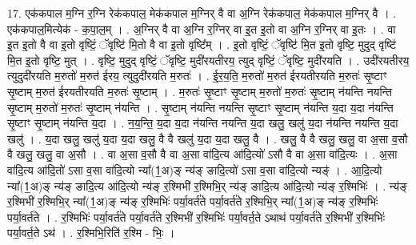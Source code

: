 \documentclass[17pt]{extarticle}
\begin{document}
17. एक॑कपाल म॒ग्नि र॒ग्नि रेक॑कपाल॒ मेक॑कपाल म॒ग्निर् वै वा अ॒ग्नि रेक॑कपाल॒ मेक॑कपाल म॒ग्निर् वै । . एक॑कपाल॒मित्येक॑ - क॒पा॒ल॒म् । . अ॒ग्निर् वै वा अ॒ग्नि र॒ग्निर् वा इ॒त इ॒तो वा अ॒ग्नि र॒ग्निर् वा इ॒तः । . वा इ॒त इ॒तो वै वा इ॒तो वृष्टिं॒ ॅवृष्टि॑ मि॒तो वै वा इ॒तो वृष्टि᳚म् । . इ॒तो वृष्टिं॒ ॅवृष्टि॑ मि॒त इ॒तो वृष्टि॒ मुदुद् वृष्टि॑ मि॒त इ॒तो वृष्टि॒ मुत् । . वृष्टि॒ मुदुद् वृष्टिं॒ ॅवृष्टि॒ मुदी॑रयतीरय॒ त्युद् वृष्टिं॒ ॅवृष्टि॒ मुदी॑रयति । . उदी॑रयतीरय॒ त्युदुदी॑रयति म॒रुतो॑ म॒रुत॑ ईरय॒ त्युदुदी॑रयति म॒रुतः॑ । . ई॒र॒य॒ति॒ म॒रुतो॑ म॒रुत॑ ईरयतीरयति म॒रुतः॑ सृ॒ष्टाꣳ सृ॒ष्टाम् म॒रुत॑ ईरयतीरयति म॒रुतः॑ सृ॒ष्टाम् । . म॒रुतः॑ सृ॒ष्टाꣳ सृ॒ष्टाम् म॒रुतो॑ म॒रुतः॑ सृ॒ष्टाम् न॑यन्ति नयन्ति सृ॒ष्टाम् म॒रुतो॑ म॒रुतः॑ सृ॒ष्टाम् न॑यन्ति । . सृ॒ष्टाम् न॑यन्ति नयन्ति सृ॒ष्टाꣳ सृ॒ष्टाम् न॑यन्ति य॒दा य॒दा न॑यन्ति सृ॒ष्टाꣳ सृ॒ष्टाम् न॑यन्ति य॒दा । . न॒य॒न्ति॒ य॒दा य॒दा न॑यन्ति नयन्ति य॒दा खलु॒ खलु॑ य॒दा न॑यन्ति नयन्ति य॒दा खलु॑ । . य॒दा खलु॒ खलु॑ य॒दा य॒दा खलु॒ वै वै खलु॑ य॒दा य॒दा खलु॒ वै । . खलु॒ वै वै खलु॒ खलु॒ वा अ॒सा व॒सौ वै खलु॒ खलु॒ वा अ॒सौ । . वा अ॒सा व॒सौ वै वा अ॒सा वा॑दि॒त्य आ॑दि॒त्यो॑ ऽसौ वै वा अ॒सा वा॑दि॒त्यः । . अ॒सा वा॑दि॒त्य आ॑दि॒तो॑ ऽसा व॒सा वा॑दि॒त्यो न्या᳚(1॒अ)ङ् न्य॑ङ् ङादि॒त्यो॑ ऽसा व॒सा वा॑दि॒त्यो न्यङ्॑ । . आ॒दि॒त्यो न्या᳚(1॒अ)ङ् न्य॑ङ् ङादि॒त्य आ॑दि॒त्यो न्य॑ङ् र॒श्मिभी॑ र॒श्मिभि॒र् न्य॑ङ् ङादि॒त्य आ॑दि॒त्यो न्य॑ङ् र॒श्मिभिः॑ । . न्य॑ङ् र॒श्मिभी॑ र॒श्मिभि॒र् न्या᳚(1॒अ)ङ् न्य॑ङ् र॒श्मिभिः॑ पर्या॒वर्त॑ते पर्या॒वर्त॑ते र॒श्मिभि॒र् 
न्या᳚(1॒अ)ङ् न्य॑ङ् र॒श्मिभिः॑ पर्या॒वर्त॑ते । . र॒श्मिभिः॑ पर्या॒वर्त॑ते पर्या॒वर्त॑ते र॒श्मिभी॑ र॒श्मिभिः॑ पर्या॒वर्त॒ते ऽथाथ॑ पर्या॒वर्त॑ते र॒श्मिभी॑ र॒श्मिभिः॑ पर्या॒वर्त॒ते ऽथ॑ । . र॒श्मिभि॒रिति॑ र॒श्मि - भिः॒ । \newline
\end{document}
